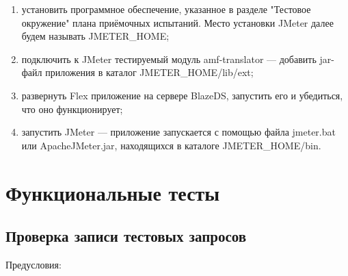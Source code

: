 \begin{enumerate}
\item установить программное обеспечение, указанное в разделе "Тестовое окружение" плана приёмочных испытаний.
Место установки JMeter далее будем называть JMETER\_HOME;
\item подключить к JMeter тестируемый модуль amf-translator --- добавить jar-файл приложения в каталог
JMETER\_HOME/lib/ext;
\item развернуть Flex приложение на сервере BlazeDS, запустить его и убедиться, что оно функционирует;
\item запустить JMeter --- приложение запускается с помощью файла jmeter.bat или ApacheJMeter.jar, находящихся в
каталоге JMETER\_HOME/bin.
\end{enumerate}

\section{Функциональные тесты}

\subsection{Проверка записи тестовых запросов}

Предусловия:

